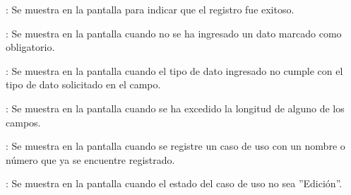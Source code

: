 \begin{Citemize}
	\item {}: Se muestra en la pantalla  para indicar que el registro fue exitoso.
	\item {}: Se muestra en la pantalla  cuando no se ha ingresado un dato marcado como obligatorio.
	\item {}: Se muestra en la pantalla  cuando el tipo de dato ingresado no cumple con el tipo de dato solicitado en el campo.
	\item {}: Se muestra en la pantalla  cuando se ha excedido la longitud de alguno de los campos.
	\item {}: Se muestra en la pantalla  cuando se registre un caso de uso con un nombre o número que ya se encuentre registrado.
	\item {}: Se muestra en la pantalla  cuando el estado del caso de uso no sea ''Edición''.
\end{Citemize}
